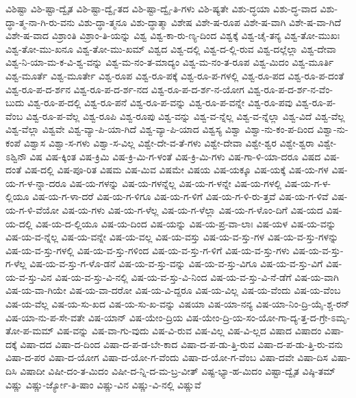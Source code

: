 {ವಿಶಿಷ್ಟಾ
ವಿಶಿ-ಷ್ಟಾ-ದ್ವೈತ
ವಿಶಿ-ಷ್ಟಾ-ದ್ವೈ-ತದ
ವಿಶಿ-ಷ್ಟಾ-ದ್ವೈ-ತಿ-ಗಳು
ವಿಶಿ-ಷ್ಯತೇ
ವಿಶು-ದ್ಧಯಾ
ವಿಶು-ದ್ಧ-ವಾದ
ವಿಶು-ದ್ಧಾ-ತ್ಮ-ನಾ-ಗಿ-ರು-ವನು
ವಿಶು-ದ್ಧಾ-ತ್ಮನೂ
ವಿಶು-ದ್ಧಾತ್ಮಾ
ವಿಶೇಷ
ವಿಶೇ-ಷ-ರೂಪ
ವಿಶೇ-ಷ-ವಾಗಿ
ವಿಶೇ-ಷ-ವಾ-ಗಿದೆ
ವಿಶೇ-ಷ-ವಾದ
ವಿಶ್ರಾಂತಿ
ವಿಶ್ರಾಂ-ತಿ-ಯನ್ನು
ವಿಶ್ವ
ವಿಶ್ವ-ಕಾ-ರು-ಣ್ಯ-ದಿಂದ
ವಿಶ್ವಕ್ಕೆ
ವಿಶ್ವ-ಚೈ-ತನ್ಯ
ವಿಶ್ವ-ತೋ-ಮುಖಃ
ವಿಶ್ವ-ತೋ-ಮು-ಖನೂ
ವಿಶ್ವ-ತೋ-ಮು-ಖಮ್
ವಿಶ್ವದ
ವಿಶ್ವ-ದಲ್ಲಿ
ವಿಶ್ವ-ದ-ಲ್ಲಿ-ರುವ
ವಿಶ್ವ-ದಲ್ಲೆಲ್ಲಾ
ವಿಶ್ವ-ದೇವಾ
ವಿಶ್ವ-ನಿ-ಯಾ-ಮ-ಕ-ವಿ-ಶ್ವ-ವನ್ನು
ವಿಶ್ವ-ಮ-ನಂ-ತ-ಮಾದ್ಯಂ
ವಿಶ್ವ-ಮ-ನಂ-ತ-ರೂಪ
ವಿಶ್ವ-ಮಿದಂ
ವಿಶ್ವ-ಮೂರ್ತಿ
ವಿಶ್ವ-ಮೂರ್ತೆ
ವಿಶ್ವ-ಮೂರ್ತೇ
ವಿಶ್ವ-ರೂಪ
ವಿಶ್ವ-ರೂ-ಪಕ್ಕೆ
ವಿಶ್ವ-ರೂ-ಪ-ಗಳಲ್ಲಿ
ವಿಶ್ವ-ರೂ-ಪದ
ವಿಶ್ವ-ರೂ-ಪ-ದಂತೆ
ವಿಶ್ವ-ರೂ-ಪ-ದ-ರ್ಶನ
ವಿಶ್ವ-ರೂ-ಪ-ದ-ರ್ಶ-ನದ
ವಿಶ್ವ-ರೂ-ಪ-ದ-ರ್ಶ-ನ-ಯೋಗ
ವಿಶ್ವ-ರೂ-ಪ-ದ-ರ್ಶ-ನ-ವೆಂ-ಬುದು
ವಿಶ್ವ-ರೂ-ಪ-ದಲ್ಲಿ
ವಿಶ್ವ-ರೂ-ಪನೆ
ವಿಶ್ವ-ರೂ-ಪ-ವನ್ನು
ವಿಶ್ವ-ರೂ-ಪ-ವನ್ನೇ
ವಿಶ್ವ-ರೂ-ಪವು
ವಿಶ್ವ-ರೂ-ಪ-ವೆಂಬ
ವಿಶ್ವ-ರೂ-ಪ-ವೆಲ್ಲ
ವಿಶ್ವ-ರೂಪಿ
ವಿಶ್ವ-ರೂಪು
ವಿಶ್ವ-ವನ್ನು
ವಿಶ್ವ-ವ-ನ್ನೆಲ್ಲ
ವಿಶ್ವ-ವ-ನ್ನೆಲ್ಲಾ
ವಿಶ್ವ-ವಿದೆ
ವಿಶ್ವ-ವೆಲ್ಲ
ವಿಶ್ವ-ವೆಲ್ಲಾ
ವಿಶ್ವವೇ
ವಿಶ್ವ-ವ್ಯಾ-ಪಿ-ಯಾ-ಗಿದೆ
ವಿಶ್ವ-ವ್ಯಾ-ಪಿ-ಯಾದ
ವಿಶ್ವಸ್ಯ
ವಿಶ್ವಾ
ವಿಶ್ವಾ-ನು-ಕಂ-ಪ-ದಿಂದ
ವಿಶ್ವಾ-ನು-ಕಂಪೆ
ವಿಶ್ವಾಸ
ವಿಶ್ವಾ-ಸ-ಗಳು
ವಿಶ್ವಾ-ಸ-ವಿಲ್ಲ
ವಿಶ್ವೇ-ದೇ-ವ-ತೆ-ಗಳು
ವಿಶ್ವೇ-ದೇವಾ
ವಿಶ್ವೇ-ಶ್ವರ
ವಿಶ್ವೇ-ಶ್ವರಾ
ವಿಶ್ವೇ-ಽಶ್ವಿನೌ
ವಿಷ
ವಿಷ-ಕ್ಕಿಂತ
ವಿಷ-ಕ್ರಿಮಿ
ವಿಷ-ಕ್ರಿ-ಮಿ-ಗ-ಳಂತೆ
ವಿಷ-ಕ್ರಿ-ಮಿ-ಗಳು
ವಿಷ-ಗಾ-ಳಿ-ಯಾ-ದರೂ
ವಿಷದ
ವಿಷ-ದಂತೆ
ವಿಷ-ದಲ್ಲಿ
ವಿಷ-ಪೂ-ರಿತ
ವಿಷಮ
ವಿಷ-ಮಿವ
ವಿಷಮೇ
ವಿಷಯ
ವಿಷ-ಯಕ್ಕೂ
ವಿಷ-ಯಕ್ಕೆ
ವಿಷ-ಯ-ಗಳ
ವಿಷ-ಯ-ಗ-ಳ-ನ್ನಾ-ದರೂ
ವಿಷ-ಯ-ಗಳನ್ನು
ವಿಷ-ಯ-ಗಳನ್ನೆಲ್ಲ
ವಿಷ-ಯ-ಗ-ಳನ್ನೇ
ವಿಷ-ಯ-ಗಳಲ್ಲಿ
ವಿಷ-ಯ-ಗ-ಳ-ಲ್ಲಿಯೂ
ವಿಷ-ಯ-ಗ-ಳಾ-ದರೆ
ವಿಷ-ಯ-ಗ-ಳಿಗೂ
ವಿಷ-ಯ-ಗ-ಳಿಗೆ
ವಿಷ-ಯ-ಗ-ಳಿ-ರು-ತ್ತವೆ
ವಿಷ-ಯ-ಗ-ಳಿವೆ
ವಿಷ-ಯ-ಗ-ಳಿ-ವೆಯೋ
ವಿಷ-ಯ-ಗಳು
ವಿಷ-ಯ-ಗ-ಳೆಲ್ಲ
ವಿಷ-ಯ-ಗ-ಳೆಲ್ಲಾ
ವಿಷ-ಯ-ಗ-ಳೊಂ-ದಿಗೆ
ವಿಷ-ಯದ
ವಿಷ-ಯ-ದಲ್ಲಿ
ವಿಷ-ಯ-ದ-ಲ್ಲಿಯೂ
ವಿಷ-ಯ-ದಿಂದ
ವಿಷ-ಯನ್ನು
ವಿಷ-ಯ-ಪ್ರ-ವಾ-ಲಾಃ
ವಿಷ-ಯಳ
ವಿಷ-ಯ-ವನ್ನು
ವಿಷ-ಯ-ವ-ನ್ನೆಲ್ಲ
ವಿಷ-ಯ-ವನ್ನೇ
ವಿಷ-ಯ-ವಲ್ಲ
ವಿಷ-ಯ-ವಸ್ತು
ವಿಷ-ಯ-ವ-ಸ್ತು-ಗಳ
ವಿಷ-ಯ-ವ-ಸ್ತು-ಗಳನ್ನು
ವಿಷ-ಯ-ವ-ಸ್ತು-ಗಳಲ್ಲಿ
ವಿಷ-ಯ-ವ-ಸ್ತು-ಗಳಿಂದ
ವಿಷ-ಯ-ವ-ಸ್ತು-ಗ-ಳಿಗೆ
ವಿಷ-ಯ-ವ-ಸ್ತು-ಗಳು
ವಿಷ-ಯ-ವ-ಸ್ತು-ಗ-ಳೆಲ್ಲ
ವಿಷ-ಯ-ವ-ಸ್ತು-ಗ-ಳೊ-ಡನೆ
ವಿಷ-ಯ-ವ-ಸ್ತು-ವನ್ನು
ವಿಷ-ಯ-ವ-ಸ್ತು-ವಿಗೂ
ವಿಷ-ಯ-ವ-ಸ್ತು-ವಿಗೆ
ವಿಷ-ಯ-ವ-ಸ್ತು-ವಿನ
ವಿಷ-ಯ-ವ-ಸ್ತು-ವಿ-ನಲ್ಲಿ
ವಿಷ-ಯ-ವ-ಸ್ತು-ವಿ-ನಿಂದ
ವಿಷ-ಯ-ವ-ಸ್ತು-ವಿ-ನೆ-ಡೆಗೆ
ವಿಷ-ಯ-ವಾಗಿ
ವಿಷ-ಯ-ವಾ-ಗಿಯೇ
ವಿಷ-ಯ-ವಾ-ದರೋ
ವಿಷ-ಯ-ವಿ-ದ್ದರೂ
ವಿಷ-ಯ-ವಿಲ್ಲ
ವಿಷ-ಯ-ವೆಂದು
ವಿಷ-ಯ-ವೆಂಬ
ವಿಷ-ಯ-ವೆಲ್ಲ
ವಿಷ-ಯ-ಸು-ಖದ
ವಿಷ-ಯ-ಸು-ಖ-ವನ್ನು
ವಿಷಯಾ
ವಿಷ-ಯಾ-ನನ್ಯ
ವಿಷ-ಯಾ-ನಿಂ-ದ್ರಿ-ಯೈ-ಶ್ಚ-ರನ್
ವಿಷ-ಯಾ-ನು-ಪ-ಸೇ-ವತೇ
ವಿಷ-ಯಾನ್
ವಿಷ-ಯೇಂ-ದ್ರಿಯ
ವಿಷ-ಯೇಂ-ದ್ರಿ-ಯ-ಸಂ-ಯೋ-ಗಾ-ದ್ಯ-ತ್ತ-ದ-ಗ್ರೇ-ಽಮೃ-ತೋ-ಪ-ಮಮ್
ವಿಷ-ವನ್ನು
ವಿಷ-ವಾ-ಗು-ವುದು
ವಿಷ-ವಿ-ರುವ
ವಿಷ-ವಿಲ್ಲ
ವಿಷ-ವಿ-ಲ್ಲದ
ವಿಷಾದ
ವಿಷಾದಂ
ವಿಷಾ-ದಕ್ಕೆ
ವಿಷಾ-ದದ
ವಿಷಾ-ದ-ದಿಂದ
ವಿಷಾ-ದ-ಪ-ಡ-ಬೇ-ಕಾದ
ವಿಷಾ-ದ-ಪ-ಡು-ತ್ತಿ-ರುವ
ವಿಷಾ-ದ-ಪ-ಡು-ತ್ತಿ-ರು-ವನು
ವಿಷಾ-ದ-ಪರ
ವಿಷಾ-ದ-ಯೋಗ
ವಿಷಾ-ದ-ಯೋ-ಗ-ವೆಂದು
ವಿಷಾ-ದ-ಯೋ-ಗ-ವೆಂಬ
ವಿಷಾ-ದವೇ
ವಿಷಾ-ದಿಸ
ವಿಷಾ-ದಿಸಿ
ವಿಷಾದೀ
ವಿಷೀ-ದಂ-ತ-ಮಿದಂ
ವಿಷೀ-ದ-ನ್ನಿ-ದ-ಮ-ಬ್ರ-ವೀತ್
ವಿಷ್ಟ-ಭ್ಯಾ-ಹ-ಮಿದಂ
ವಿಷ್ಟಾ-ದ್ವೈತ
ವಿಷ್ಠಿ-ತಮ್
ವಿಷ್ಣು
ವಿಷ್ಣು-ರ್ಜ್ಯೋ-ತಿ-ಷಾಂ
ವಿಷ್ಣು-ವಿನ
ವಿಷ್ಣು-ವಿ-ನಲ್ಲಿ
ವಿಷ್ಣುವೆ
}
